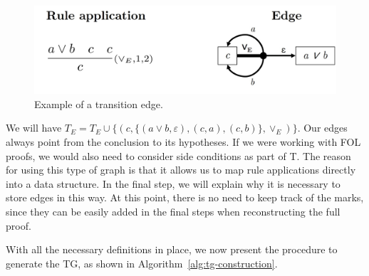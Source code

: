     \begin{figure}
        \centering
        \includegraphics[width=0.8\linewidth]{resources/te-example.jpg}
        \caption{Example of a transition edge.}
        \label{fig:te-ex}
    \end{figure}

We will have \(T_E = T_E \cup \{(c, \{(a \vee b, \varepsilon), (c, a), (c, b)\}, \vee_E)\}\). Our edges always point from the conclusion to its hypotheses. If we were working with FOL proofs, we would also need to consider side conditions as part of T. The reason for using this type of graph is that it allows us to map rule applications directly into a data structure. In the final step, we will explain why it is necessary to store edges in this way. At this point, there is no need to keep track of the marks, since they can be easily added in the final steps when reconstructing the full proof.

\vspace{1em}
With all the necessary definitions in place, we now present the procedure to generate the TG, as shown in Algorithm~\ref{alg:tg-construction}.


